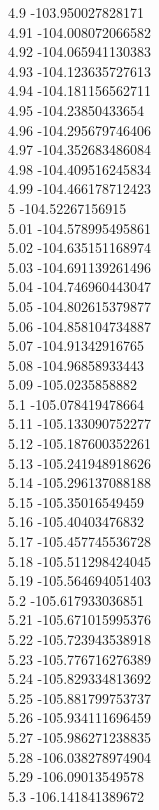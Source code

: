 {4.9	-103.950027828171\\
4.91	-104.008072066582\\
4.92	-104.065941130383\\
4.93	-104.123635727613\\
4.94	-104.181156562711\\
4.95	-104.23850433654\\
4.96	-104.295679746406\\
4.97	-104.352683486084\\
4.98	-104.409516245834\\
4.99	-104.466178712423\\
5	-104.52267156915\\
5.01	-104.578995495861\\
5.02	-104.635151168974\\
5.03	-104.691139261496\\
5.04	-104.746960443047\\
5.05	-104.802615379877\\
5.06	-104.858104734887\\
5.07	-104.91342916765\\
5.08	-104.96858933443\\
5.09	-105.0235858882\\
5.1	-105.078419478664\\
5.11	-105.133090752277\\
5.12	-105.187600352261\\
5.13	-105.241948918626\\
5.14	-105.296137088188\\
5.15	-105.35016549459\\
5.16	-105.40403476832\\
5.17	-105.457745536728\\
5.18	-105.511298424045\\
5.19	-105.564694051403\\
5.2	-105.617933036851\\
5.21	-105.671015995376\\
5.22	-105.723943538918\\
5.23	-105.776716276389\\
5.24	-105.829334813692\\
5.25	-105.881799753737\\
5.26	-105.934111696459\\
5.27	-105.986271238835\\
5.28	-106.038278974904\\
5.29	-106.09013549578\\
5.3	-106.141841389672\\
}
